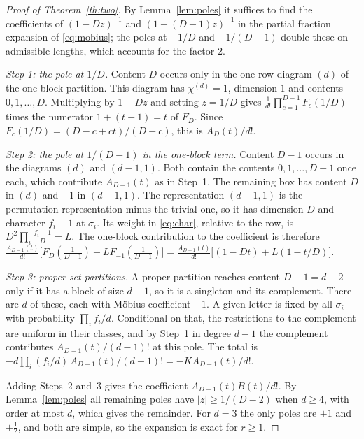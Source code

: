 \documentclass[11pt,a4paper]{article}
\theoremstyle{definition}\newtheorem{definition}[theorem]{Definition}
\theoremstyle{remark}\newtheorem{remark}[theorem]{Remark}\newtheorem{example}[theorem]{Example}
\numberwithin{equation}{section}
\begin{document}
\begin{proof}[Proof of Theorem~\ref{th:two}]
By Lemma~\ref{lem:poles} it suffices to find the coefficients of $(1-Dz)^{-1}$ and $(1-(D-1)z)^{-1}$ in the partial fraction expansion of \eqref{eq:mobius}; the poles at $-1/D$ and $-1/(D-1)$ double these on admissible lengths, which accounts for the factor $2$.

\emph{Step 1: the pole at $1/D$.} Content $D$ occurs only in the one-row diagram $(d)$ of the one-block partition. This diagram has $\chi^{(d)}=1$, dimension $1$ and contents $0,1,\dots,D$. Multiplying by $1-Dz$ and setting $z=1/D$ gives $\frac1{d!}\prod_{c=1}^{D-1}F_c(1/D)$ times the numerator $1+(t-1)=t$ of $F_D$. Since $F_c(1/D)=(D-c+ct)/(D-c)$, this is $A_D(t)/d!$.

\emph{Step 2: the pole at $1/(D-1)$ in the one-block term.} Content $D-1$ occurs in the diagrams $(d)$ and $(d-1,1)$. Both contain the contents $0,1,\dots,D-1$ once each, which contribute $A_{D-1}(t)$ as in Step~1. The remaining box has content $D$ in $(d)$ and $-1$ in $(d-1,1)$. The representation $(d-1,1)$ is the permutation representation minus the trivial one, so it has dimension $D$ and character $f_i-1$ at $\sigma_i$. Its weight in \eqref{eq:char}, relative to the row, is $D^2\prod_i\frac{f_i-1}{D}=L$. The one-block contribution to the coefficient is therefore $\frac{A_{D-1}(t)}{d!}\bigl[F_D(\tfrac1{D-1})+LF_{-1}(\tfrac1{D-1})\bigr]=\frac{A_{D-1}(t)}{d!}\bigl[(1-Dt)+L(1-t/D)\bigr]$.

\emph{Step 3: proper set partitions.} A proper partition reaches content $D-1=d-2$ only if it has a block of size $d-1$, so it is a singleton and its complement. There are $d$ of these, each with Möbius coefficient $-1$. A given letter is fixed by all $\sigma_i$ with probability $\prod_if_i/d$. Conditional on that, the restrictions to the complement are uniform in their classes, and by Step~1 in degree $d-1$ the complement contributes $A_{D-1}(t)/(d-1)!$ at this pole. The total is $-d\prod_i(f_i/d)\,A_{D-1}(t)/(d-1)!=-KA_{D-1}(t)/d!$.

Adding Steps~2 and~3 gives the coefficient $A_{D-1}(t)B(t)/d!$. By Lemma~\ref{lem:poles} all remaining poles have $|z|\ge1/(D-2)$ when $d\ge4$, with order at most $d$, which gives the remainder. For $d=3$ the only poles are $\pm1$ and $\pm\frac12$, and both are simple, so the expansion is exact for $r\ge1$.
\end{proof}
\end{document}
